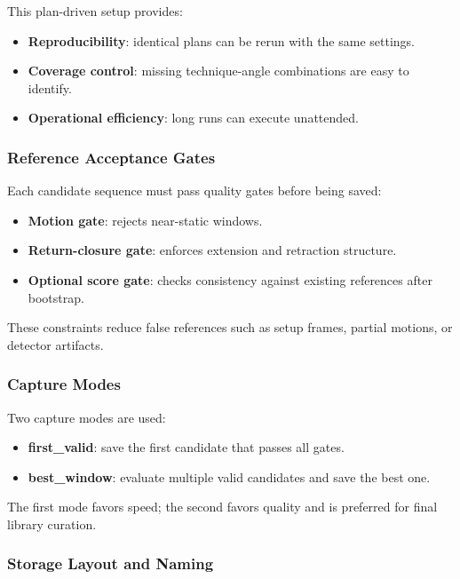 \documentclass[12pt]{article}
\begin{document}
{This plan-driven setup provides:

\begin{itemize}
    \item \textbf{Reproducibility}: identical plans can be rerun with the same settings.
    \item \textbf{Coverage control}: missing technique-angle combinations are easy to identify.
    \item \textbf{Operational efficiency}: long runs can execute unattended.
\end{itemize}

\subsubsection{Reference Acceptance Gates}

Each candidate sequence must pass quality gates before being saved:

\begin{itemize}
    \item \textbf{Motion gate}: rejects near-static windows.
    \item \textbf{Return-closure gate}: enforces extension and retraction structure.
    \item \textbf{Optional score gate}: checks consistency against existing references after bootstrap.
\end{itemize}

These constraints reduce false references such as setup frames, partial motions, or detector artifacts.

\subsubsection{Capture Modes}

Two capture modes are used:

\begin{itemize}
    \item \textbf{first\_valid}: save the first candidate that passes all gates.
    \item \textbf{best\_window}: evaluate multiple valid candidates and save the best one.
\end{itemize}

The first mode favors speed; the second favors quality and is preferred for final library curation.

\subsubsection{Storage Layout and Naming}

}
\end{document}
